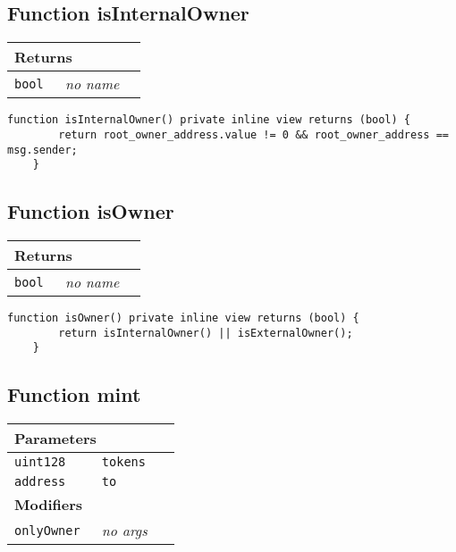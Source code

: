 \subsection{Function isInternalOwner}


\ifsoltables
\noindent\begin{tabular}{|l|l|p{5cm}|}\hline
\multicolumn{3}{|l|}{\bf Returns}\\\hline
\tt bool & {\em no name} &\\\hline
\end{tabular}
\fi

\vspace{2cm}

\begin{lstlisting}[firstnumber=472]
    function isInternalOwner() private inline view returns (bool) {
        return root_owner_address.value != 0 && root_owner_address == msg.sender;
    }
\end{lstlisting}

\subsection{Function isOwner}


\ifsoltables
\noindent\begin{tabular}{|l|l|p{5cm}|}\hline
\multicolumn{3}{|l|}{\bf Returns}\\\hline
\tt bool & {\em no name} &\\\hline
\end{tabular}
\fi

\vspace{2cm}

\begin{lstlisting}[firstnumber=468]
    function isOwner() private inline view returns (bool) {
        return isInternalOwner() || isExternalOwner();
    }
\end{lstlisting}

\subsection{Function mint}


\ifsoltables
\noindent\begin{tabular}{|l|l|p{5cm}|}\hline
\multicolumn{3}{|l|}{\bf Parameters}\\\hline
\tt uint128 & \tt tokens &\\\hline
\tt address & \tt to &\\\hline
\multicolumn{3}{|l|}{\bf Modifiers}\\\hline
\tt onlyOwner & {\em no args} &\\\hline
\end{tabular}
\fi


